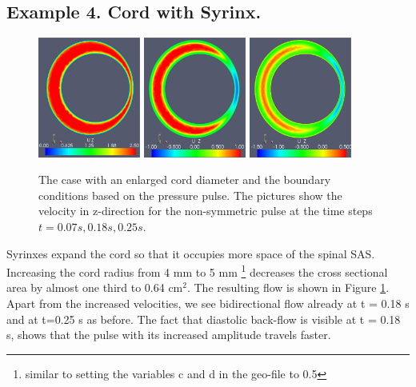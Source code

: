 \subsection{Example 4. Cord with Syrinx.}
\begin{figure}\begin{center}
\includegraphics[width=0.3\textwidth]{chapters/hentschel/pdf/pulse_syrinx_f1_08_syrinx05_sysmax_nmb7.pdf}
\includegraphics[width=0.3\textwidth]{chapters/hentschel/pdf/pulse_syrinx_f1_08_syrinx05_sysdia_nmb18.pdf}
\includegraphics[width=0.3\textwidth]{chapters/hentschel/pdf/pulse_syrinx_f1_08_syrinx05_diamin1_nmb25.pdf}
\caption{The case with an enlarged cord diameter and the boundary
    conditions based on the pressure pulse. The pictures show the velocity in z-direction for the non-symmetric pulse at the time steps $t=0.07s, 0.18s, 0.25s$.}
\label{fig:case4}
\end{center}\end{figure}

Syrinxes expand the cord so that it occupies more space of the spinal SAS. Increasing the cord radius from 4 mm to 5 mm \footnote{similar to setting the variables c and d in the geo-file to 0.5} decreases the cross sectional area by almost one third to 0.64 $\mathrm{cm^2}$. The resulting flow is shown in Figure \ref{fig:case4}. Apart from the increased velocities, we see bidirectional flow already at t = 0.18 s and at t=0.25 s as before. The fact that diastolic back-flow is visible at t = 0.18 s, shows that the pulse with its increased amplitude travels faster.

